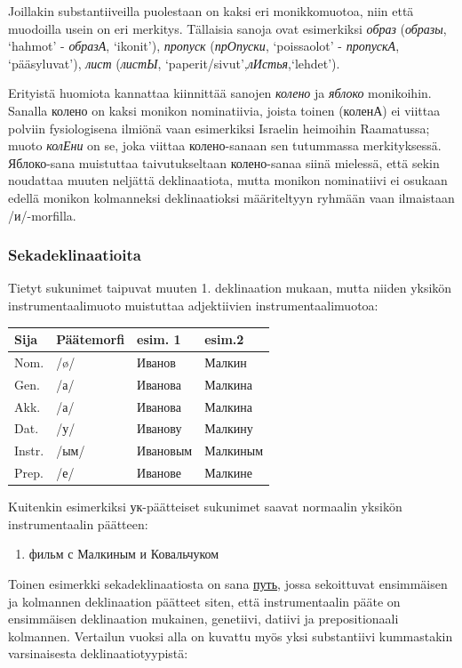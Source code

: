 \documentclass[]{scrartcl}
\providecommand{\tightlist}{%
  \setlength{\itemsep}{0pt}\setlength{\parskip}{0pt}}
\begin{document}
Joillakin substantiiveilla puolestaan on kaksi eri monikkomuotoa, niin
että muodoilla usein on eri merkitys. Tällaisia sanoja ovat esimerkiksi
\emph{образ} (\emph{образы}, `hahmot' - \emph{образА}, `ikonit'),
\emph{пропуск} (\emph{прОпуски}, `poissaolot' - \emph{пропускА},
`pääsyluvat'), \emph{лист} (\emph{листЫ},
`paperit/sivut',\emph{лИстья},`lehdet').

Erityistä huomiota kannattaa kiinnittää sanojen \emph{колено} ja
\emph{яблоко} monikoihin. Sanalla колено on kaksi monikon nominatiivia,
joista toinen (коленА) ei viittaa polviin fysiologisena ilmiönä vaan
esimerkiksi Israelin heimoihin Raamatussa; muoto \emph{колЕни} on se,
joka viittaa колено-sanaan sen tutummassa merkityksessä. Яблоко-sana
muistuttaa taivutukseltaan колено-sanaa siinä mielessä, että sekin
noudattaa muuten neljättä deklinaatiota, mutta monikon nominatiivi ei
osukaan edellä monikon kolmanneksi deklinaatioksi määriteltyyn ryhmään
vaan ilmaistaan /и/-morfilla.

\subsubsection{Sekadeklinaatioita}\label{sekadeklinaatioita}

Tietyt sukunimet taipuvat muuten 1. deklinaation mukaan, mutta niiden
yksikön instrumentaalimuoto muistuttaa adjektiivien
instrumentaalimuotoa:

\begin{longtable}[c]{@{}llll@{}}
\toprule
Sija & Päätemorfi & esim. 1 & esim.2\tabularnewline
\midrule
\endhead
Nom. & /ø/ & Иванов & Малкин\tabularnewline
Gen. & /а/ & Иванова & Малкина\tabularnewline
Akk. & /а/ & Иванова & Малкина\tabularnewline
Dat. & /у/ & Иванову & Малкину\tabularnewline
Instr. & /ым/ & Ивановым & Малкиным\tabularnewline
Prep. & /е/ & Иванове & Малкине\tabularnewline
\bottomrule
\end{longtable}

Kuitenkin esimerkiksi ук-päätteiset sukunimet saavat normaalin yksikön
instrumentaalin päätteen:

\begin{enumerate}
\def\labelenumi{(\arabic{enumi})}
\setcounter{enumi}{10}
\tightlist
\item
  фильм с Малкиным и Ковальчуком
\end{enumerate}

Toinen esimerkki sekadeklinaatiosta on sana
\href{https://ru.wiktionary.org/wiki/\%D0\%BF\%D1\%83\%D1\%82\%D1\%8C}{путь},
jossa sekoittuvat ensimmäisen ja kolmannen deklinaation päätteet siten,
että instrumentaalin pääte on ensimmäisen deklinaation mukainen,
genetiivi, datiivi ja prepositionaali kolmannen. Vertailun vuoksi alla
on kuvattu myös yksi substantiivi kummastakin varsinaisesta
deklinaatiotyypistä:
\end{document}
